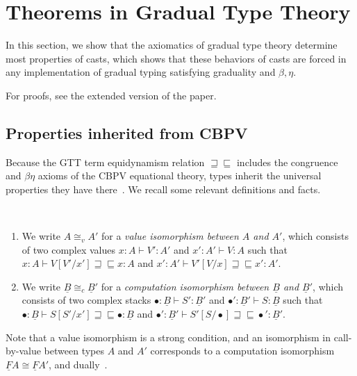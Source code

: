 \documentclass[acmsmall,screen,12pt]{acmart}
\renewcommand{\u}{\underline}
\newcommand{\ltdyn}{\sqsubseteq}
\newcommand{\gtdyn}{\sqsupseteq}
\newcommand{\equidyn}{\mathrel{\gtdyn\ltdyn}}
\begin{document}
\section{Theorems in Gradual Type Theory}
\label{sec:theorems-in-gtt}

In this section, we show that the axiomatics of gradual type theory
determine most properties of casts, which shows that these behaviors of
casts are forced in any implementation of gradual typing satisfying
graduality and $\beta,\eta$.
\begin{shortonly}
  For proofs, see the extended version of the paper.
\end{shortonly}
  
\begin{longonly}
\subsection{Properties inherited from CBPV}

Because the GTT term equidynamism relation $\equidyn$ includes the
congruence and $\beta\eta$ axioms of the CBPV equational theory, types
inherit the universal properties they have there~\cite{levy03cbpvbook}.  We recall
some relevant definitions and facts.

\begin{definition}[Isomorphism] ~
  \begin{enumerate}
  \item We write $A \cong_v A'$ for a \emph{value isomorphism between
    $A$ and $A'$}, which consists of two complex values $x : A \vdash V'
    : A'$ and $x' : A' \vdash V : A$ such that $x : A \vdash V[V'/x']
    \equidyn x : A$ and $x' : A' \vdash V'[V/x] \equidyn x' : A'$.
  \item We write $\u B \cong_c \u B'$ for a \emph{computation
    isomorphism between $\u B$ and $\u B'$}, which consists of two
    complex stacks $\bullet : \u B \vdash S' : \u B'$ and $\bullet' : \u
    B' \vdash S : \u B$ such that $\bullet : \u B \vdash S[S'/x']
    \equidyn \bullet : \u B$ and $\bullet' : \u B' \vdash S'[S/\bullet]
    \equidyn \bullet' : \u B'$.
  \end{enumerate}
\end{definition}
Note that a value isomorphism is a strong condition, and an isomorphism
in call-by-value between types $A$ and $A'$ corresponds to a computation
isomorphism $\u F A \cong \u F A'$, and dually~\cite{levy17popl}.

\smallskip


\end{longonly}
\end{document}
